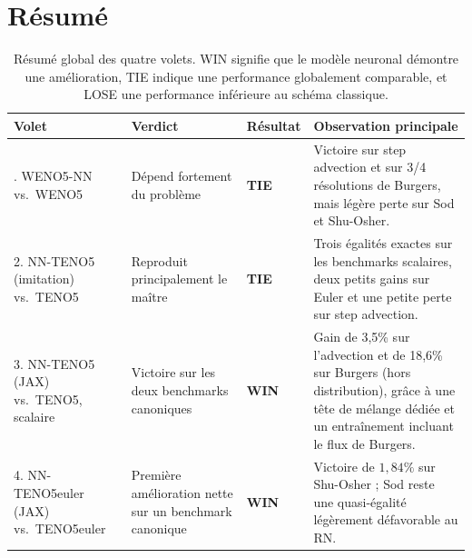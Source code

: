 \documentclass[11pt]{article}
\newcommand{\WIN}{%
    \cellcolor{winbg}\textcolor{wintext}{\textbf{WIN}}%
}
\newcommand{\TIE}{%
    \cellcolor{tiebg}\textcolor{tietext}{\textbf{TIE}}%
}
\newcommand{\rowrule}{\specialrule{0.30pt}{0pt}{0pt}}
\begin{document}

\section{Résumé}

\begin{table}[htbp]

\small

\begin{tabularx}{\textwidth}{
    @{}
    >{\raggedright\arraybackslash}p{}
    >{\raggedright\arraybackslash}p{}
    >{\centering\arraybackslash}p{}
    >{\raggedright\arraybackslash}X
    @{}
}

\toprule

\textbf{Volet}
&
\textbf{Verdict}
&
\textbf{Résultat}
&
\textbf{Observation principale}
\\

\midrule

1. WENO5-NN vs.\ WENO5
&
Dépend fortement du problème
&
\TIE
&
Victoire sur step advection et sur 3/4 résolutions de Burgers,
mais légère perte sur Sod et Shu-Osher.
\\

\rowrule

2. NN-TENO5 (imitation) vs.\ TENO5
&
Reproduit principalement le maître
&
\TIE
&
Trois égalités exactes sur les benchmarks scalaires,
deux petits gains sur Euler et une petite perte sur step advection.
\\

\rowrule

3. NN-TENO5 (JAX) vs.\ TENO5, scalaire
&
Victoire sur les deux benchmarks canoniques
&
\WIN
&
Gain de 3,5\% sur l'advection et de 18,6\% sur Burgers (hors distribution),
grâce à une tête de mélange dédiée et un entraînement incluant le flux de
Burgers.
\\

\rowrule

4. NN-TENO5euler (JAX) vs.\ TENO5euler
&
Première amélioration nette sur un benchmark canonique
&
\WIN
&
Victoire de $1,84\%$ sur Shu-Osher ;
Sod reste une quasi-égalité légèrement défavorable au RN.
\\

\bottomrule

\end{tabularx}

\caption{
Résumé global des quatre volets.
WIN signifie que le modèle neuronal démontre une amélioration,
TIE indique une performance globalement comparable,
et LOSE une performance inférieure au schéma classique.
}

\end{table}
\end{document}
